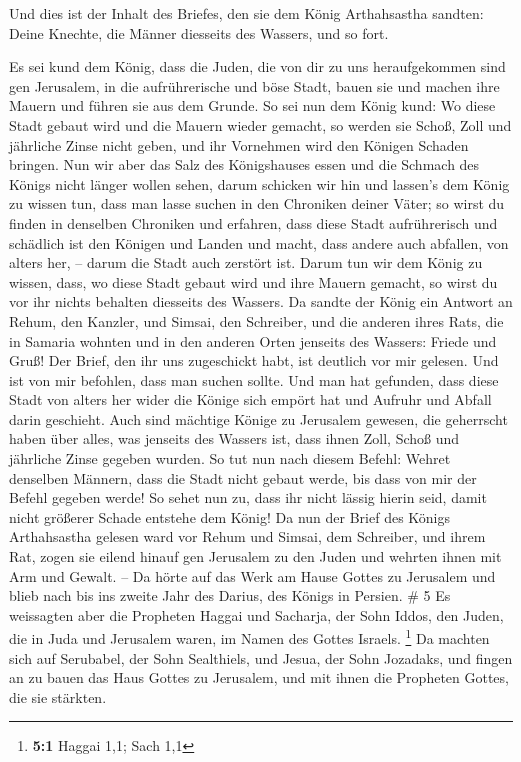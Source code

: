  Und dies ist der Inhalt des Briefes, den sie dem König
Arthahsastha sandten: Deine Knechte, die Männer diesseits des Wassers,
und so fort.

 Es sei kund dem König, dass die Juden, die von dir zu
uns heraufgekommen sind gen Jerusalem, in die aufrührerische und böse
Stadt, bauen sie und machen ihre Mauern und führen sie aus dem Grunde.
 So sei nun dem König kund: Wo diese Stadt gebaut wird
und die Mauern wieder gemacht, so werden sie Schoß, Zoll und jährliche
Zinse nicht geben, und ihr Vornehmen wird den Königen Schaden bringen.
 Nun wir aber das Salz des Königshauses essen und die
Schmach des Königs nicht länger wollen sehen, darum schicken wir hin und
lassen's dem König zu wissen tun,  dass man lasse suchen
in den Chroniken deiner Väter; so wirst du finden in denselben Chroniken
und erfahren, dass diese Stadt aufrührerisch und schädlich ist den
Königen und Landen und macht, dass andere auch abfallen, von alters her,
-- darum die Stadt auch zerstört ist.  Darum tun wir dem
König zu wissen, dass, wo diese Stadt gebaut wird und ihre Mauern
gemacht, so wirst du vor ihr nichts behalten diesseits des Wassers.
 Da sandte der König ein Antwort an Rehum, den Kanzler,
und Simsai, den Schreiber, und die anderen ihres Rats, die in Samaria
wohnten und in den anderen Orten jenseits des Wassers: Friede und Gruß!
 Der Brief, den ihr uns zugeschickt habt, ist deutlich
vor mir gelesen.  Und ist von mir befohlen, dass man
suchen sollte. Und man hat gefunden, dass diese Stadt von alters her
wider die Könige sich empört hat und Aufruhr und Abfall darin geschieht.
 Auch sind mächtige Könige zu Jerusalem gewesen, die
geherrscht haben über alles, was jenseits des Wassers ist, dass ihnen
Zoll, Schoß und jährliche Zinse gegeben wurden.  So tut
nun nach diesem Befehl: Wehret denselben Männern, dass die Stadt nicht
gebaut werde, bis dass von mir der Befehl gegeben werde! 
So sehet nun zu, dass ihr nicht lässig hierin seid, damit nicht größerer
Schade entstehe dem König!  Da nun der Brief des Königs
Arthahsastha gelesen ward vor Rehum und Simsai, dem Schreiber, und ihrem
Rat, zogen sie eilend hinauf gen Jerusalem zu den Juden und wehrten
ihnen mit Arm und Gewalt. --  Da hörte auf das Werk am
Hause Gottes zu Jerusalem und blieb nach bis ins zweite Jahr des Darius,
des Königs in Persien. \# 5  Es weissagten aber die
Propheten Haggai und Sacharja, der Sohn Iddos, den Juden, die in Juda
und Jerusalem waren, im Namen des Gottes Israels. \footnote{\textbf{5:1}
  Haggai 1,1; Sach 1,1}  Da machten sich auf Serubabel,
der Sohn Sealthiels, und Jesua, der Sohn Jozadaks, und fingen an zu
bauen das Haus Gottes zu Jerusalem, und mit ihnen die Propheten Gottes,
die sie stärkten.

